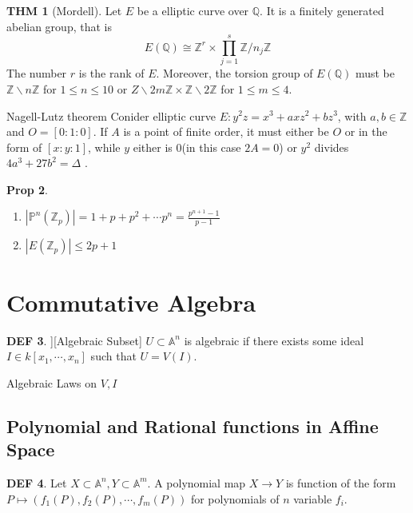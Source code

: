 \documentclass[twocolumn]{article}
\newcommand{\A}{\mathbb{A}}
\newcommand{\Z}{\mathbb{Z}}
\newcommand{\F}{\mathbb{Z}}
\newcommand{\Q}{\mathbb{Q}}
\renewcommand{\P}{\mathbb{P}}
\theoremstyle{definition}
\newtheorem{thm}{THM}
\newtheorem{prop}[thm]{Prop}
\newtheorem{defi}[thm]{DEF}
\theoremstyle{remark}
\begin{document}
\begin{thm}[Mordell] 
	Let $E$ be a elliptic curve over $\Q$. It is a finitely generated abelian group, that is 
	$$
	E(\Q) \cong  \Z^r \times \prod_{j=1}^s \Z / n_j \Z
	$$
	The number $r$ is the rank of $E$.
	Moreover, the torsion group of $E(\Q)$ must be $\Z \backslash n\Z$ for $1 \leq n \leq 10$ or $Z \backslash 2m \Z \times \Z \backslash 2\Z$ for $1 \leq m \leq 4$.
\end{thm}

\begin{fthm}{Nagell-Lutz theorem}{}
	Conider elliptic curve $E: y^2z = x^3 + axz^2 + bz^3$, with $a, b \in \Z$ and $O = [0:1:0]$.
	If $A$ is a point of finite order, it must either be $O$ or in the form of $[x:y:1]$, while $y $ either is $0$(in this case $2A = 0$) or $y^2$ divides $4a^3 + 27b^2 = \Delta$ .
\end{fthm}

\begin{prop} 
	\begin{enumerate}
		\item $|\P^n(\F_p)| = 1 + p + p^2 + \cdots p^n = \frac{p^{n+1}-1}{p-1}$
		\item $|E(\F_p)| \leq 2p + 1$
	\end{enumerate}
\end{prop}

\section{Commutative Algebra}

\begin{defi}][Algebraic Subset]
	$U \subset \A^n$ is algebraic if there exists some ideal $I \in k[x_1, \cdots, x_n]$ such that $U = V(I)$.
\end{defi}

\begin{toverify}{Algebraic Laws on $V, I$}{}

\end{toverify}

\subsection{Polynomial and Rational functions in Affine Space}

\begin{defi}
Let $X \subset \A^n, Y \subset \A^m$. 
A polynomial map $X \rightarrow Y$ is function of the form $P \mapsto (f_1(P), f_2(P), \cdots, f_m(P))$ for polynomials of $n$ variable $f_i$.
\end{defi}
\end{document}

